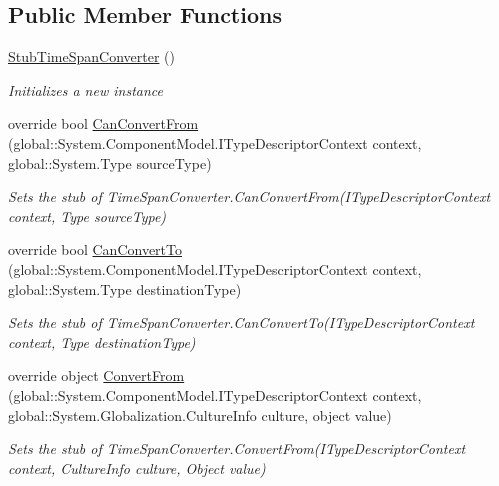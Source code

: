 \subsection*{Public Member Functions}
\begin{DoxyCompactItemize}
\item 
\hyperlink{class_system_1_1_component_model_1_1_fakes_1_1_stub_time_span_converter_aa17ae6e5e01aaa6f8fb593afd4d63a13}{Stub\-Time\-Span\-Converter} ()
\begin{DoxyCompactList}\small\item\em Initializes a new instance\end{DoxyCompactList}\item 
override bool \hyperlink{class_system_1_1_component_model_1_1_fakes_1_1_stub_time_span_converter_a0ec6dc4b6f045d2723e3fdb3af145ebe}{Can\-Convert\-From} (global\-::\-System.\-Component\-Model.\-I\-Type\-Descriptor\-Context context, global\-::\-System.\-Type source\-Type)
\begin{DoxyCompactList}\small\item\em Sets the stub of Time\-Span\-Converter.\-Can\-Convert\-From(\-I\-Type\-Descriptor\-Context context, Type source\-Type)\end{DoxyCompactList}\item 
override bool \hyperlink{class_system_1_1_component_model_1_1_fakes_1_1_stub_time_span_converter_a4f17d99b0791f0d4bf9bfc1b7166689b}{Can\-Convert\-To} (global\-::\-System.\-Component\-Model.\-I\-Type\-Descriptor\-Context context, global\-::\-System.\-Type destination\-Type)
\begin{DoxyCompactList}\small\item\em Sets the stub of Time\-Span\-Converter.\-Can\-Convert\-To(\-I\-Type\-Descriptor\-Context context, Type destination\-Type)\end{DoxyCompactList}\item 
override object \hyperlink{class_system_1_1_component_model_1_1_fakes_1_1_stub_time_span_converter_a8d729500b031d6f269379c90aa51dca3}{Convert\-From} (global\-::\-System.\-Component\-Model.\-I\-Type\-Descriptor\-Context context, global\-::\-System.\-Globalization.\-Culture\-Info culture, object value)
\begin{DoxyCompactList}\small\item\em Sets the stub of Time\-Span\-Converter.\-Convert\-From(\-I\-Type\-Descriptor\-Context context, Culture\-Info culture, Object value)\end{DoxyCompactList}\item 

\end{DoxyCompactItemize}
